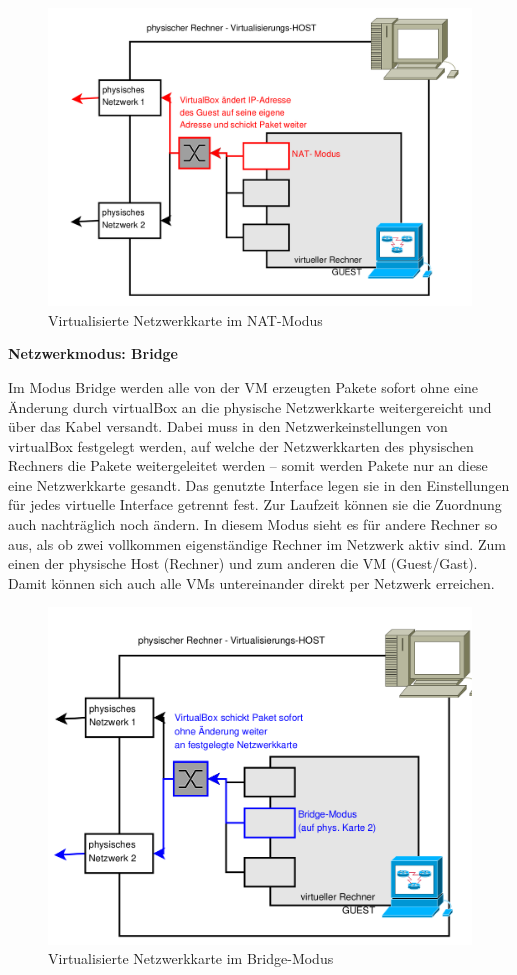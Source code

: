 \documentclass[paper=a4,fontsize=11pt]{scrartcl}%
\numberwithin{equation}{section}
\begin{document}
\begin{figure}[H]
\centering
\includegraphics[scale=0.35]{vbox5}
\caption{Virtualisierte Netzwerkkarte im NAT-Modus}
\end{figure}
\begin{center}
\Large{\textbf{Netzwerkmodus: Bridge}}
\end{center}
Im Modus Bridge werden alle von der VM erzeugten Pakete sofort ohne eine Änderung durch virtualBox an die physische Netzwerkkarte weitergereicht und über das Kabel versandt. Dabei muss in den Netzwerkeinstellungen von virtualBox festgelegt werden, auf welche der Netzwerkkarten des physischen Rechners die Pakete weitergeleitet werden -- somit werden Pakete nur an diese eine Netzwerkkarte gesandt. Das genutzte Interface legen sie in den Einstellungen für jedes virtuelle Interface getrennt fest. Zur Laufzeit können sie die Zuordnung auch nachträglich noch ändern. In diesem Modus sieht es für andere Rechner so aus, als ob zwei vollkommen eigenständige Rechner im Netzwerk aktiv sind. Zum einen der physische Host (Rechner) und zum anderen die VM (Guest/Gast). Damit können sich auch alle VMs untereinander direkt per Netzwerk erreichen.
\begin{figure}[H]
\centering
\includegraphics[scale=0.35]{vbox6}
\caption{Virtualisierte Netzwerkkarte im Bridge-Modus}
\end{figure}
\end{document}
